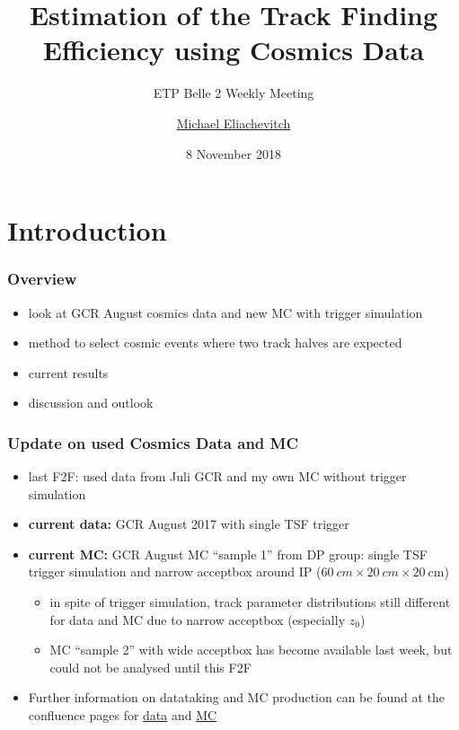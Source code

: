 \documentclass[18pt]{beamer}
\title{Estimation of the Track Finding Efficiency using Cosmics Data}
\subtitle{ETP Belle 2 Weekly Meeting}
\author{\underline{Michael Eliachevitch}}
\date{8 November 2018}
\institute{ETP -- KIT}
\begin{document}

\section{Introduction}
\begin{frame}
  \titlepage
\end{frame}

\begin{frame}
  \frametitle{Overview}
  \begin{itemize}
  \item look at GCR August cosmics data and new MC with trigger simulation
  \item method to select cosmic events where two track halves are expected
  \item current results 
  \item discussion and outlook
  \end{itemize}
  
\end{frame}

\begin{frame}
  \frametitle{Update on used Cosmics Data and MC}
  \begin{itemize}
  \item last F2F: used data from Juli GCR and my own MC without trigger simulation
  \item \textbf{current data:} GCR August 2017  with single TSF trigger
  \item \textbf{current MC:} GCR August MC ``sample 1'' from DP group: single TSF trigger simulation and narrow acceptbox around IP ($\SI{60}{cm} \times \SI{20}{cm} \times \SI{20}{\cm}$)
    \begin{itemize}
    \item in spite of trigger simulation, track parameter distributions still different  for data and MC due to narrow acceptbox (especially $z_0$)
    \item MC ``sample 2'' with wide acceptbox has become available last week, but could not be analysed until this F2F
    \end{itemize}
  \item Further information on datataking and MC production can be found at the confluence pages for
    \href{https://confluence.desy.de/display/BI/Data+Production+Global+Cosmics+Run+Data\#DataProductionGlobalCosmicsRunData-Runinfo}{data}
    and \href{https://confluence.desy.de/display/BI/Data+Production+Global+Cosmics+Run+MC}{MC}
  \end{itemize}    
\end{frame}
\end{document}
